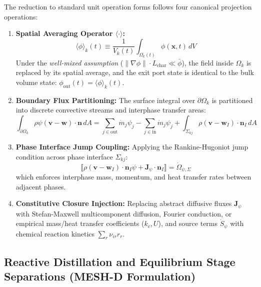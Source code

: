 \documentclass[11pt,a4paper]{article}
\begin{document}
The reduction to standard unit operation forms follows four canonical projection operations:
\begin{enumerate}[leftmargin=*]
    \item \textbf{Spatial Averaging Operator $\langle \cdot \rangle$:}
    \begin{equation}
    \langle \phi \rangle_k(t) \equiv \frac{1}{V_k(t)} \int_{\Omega_k(t)} \phi(\mathbf{x}, t) \, dV
    \end{equation}
    Under the \textit{well-mixed assumption} ($\|\nabla \phi\| \cdot L_{\text{char}} \ll \bar{\phi}$), the field inside $\Omega_k$ is replaced by its spatial average, and the exit port state is identical to the bulk volume state: $\phi_{\text{out}}(t) = \langle \phi \rangle_k(t)$.
    \item \textbf{Boundary Flux Partitioning:}
    The surface integral over $\partial \Omega_k$ is partitioned into discrete convective streams and interphase transfer areas:
    \begin{equation}
    \int_{\partial \Omega_k} \rho \psi (\mathbf{v} - \mathbf{w}) \cdot \mathbf{n} \, dA = \sum_{j \in \text{out}} \dot{m}_j \psi_j - \sum_{j \in \text{in}} \dot{m}_j \psi_j + \int_{\Sigma_{kj}} \rho (\mathbf{v} - \mathbf{w}_I) \cdot \mathbf{n}_I \, dA
    \end{equation}
    \item \textbf{Phase Interface Jump Coupling:}
    Applying the Rankine-Hugoniot jump condition across phase interface $\Sigma_{kj}$:
    \begin{equation}
    \llbracket \rho (\mathbf{v} - \mathbf{w}_I) \cdot \mathbf{n}_I \psi + \mathbf{J}_\psi \cdot \mathbf{n}_I \rrbracket = \dot{\Omega}_{\psi, \Sigma}
    \end{equation}
    which enforces interphase mass, momentum, and heat transfer rates between adjacent phases.
    \item \textbf{Constitutive Closure Injection:}
    Replacing abstract diffusive fluxes $\mathbf{J}_\psi$ with Stefan-Maxwell multicomponent diffusion, Fourier conduction, or empirical mass/heat transfer coefficients ($k_c, U$), and source terms $\dot{S}_\psi$ with chemical reaction kinetics $\sum_r \nu_{ir} r_r$.
\end{enumerate}

\subsection{Reactive Distillation and Equilibrium Stage Separations (MESH-D Formulation)}
\end{document}
